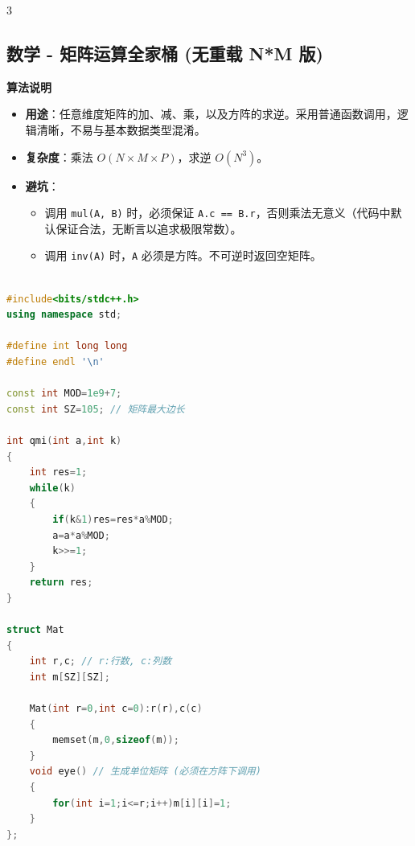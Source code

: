 \documentclass[10pt,landscape,a4paper]{article}
\begin{document}
\begin{multicols*}{3}
\subsection*{数学 - 矩阵运算全家桶 (无重载 N*M 版)}
\par\addvspace{0.7ex}\noindent\textbf{算法说明}\par\nobreak
\begin{itemize}
\item \textbf{用途}：任意维度矩阵的加、减、乘，以及方阵的求逆。采用普通函数调用，逻辑清晰，不易与基本数据类型混淆。
\item \textbf{复杂度}：乘法 $O(N \times M \times P)$，求逆 $O(N^3)$。
\item \textbf{避坑}：
\begin{itemize}
\item 调用 \texttt{m\allowbreak{}u\allowbreak{}l\allowbreak{}(\allowbreak{}A\allowbreak{},\allowbreak{} \allowbreak{}B\allowbreak{})} 时，必须保证 \texttt{A\allowbreak{}.\allowbreak{}c\allowbreak{} \allowbreak{}=\allowbreak{}=\allowbreak{} \allowbreak{}B\allowbreak{}.\allowbreak{}r}，否则乘法无意义（代码中默认保证合法，无断言以追求极限常数）。
\item 调用 \texttt{i\allowbreak{}n\allowbreak{}v\allowbreak{}(\allowbreak{}A\allowbreak{})} 时，\texttt{A} 必须是方阵。不可逆时返回空矩阵。
\end{itemize}
\end{itemize}
\par{}\par
\begin{lstlisting}[language=C++]

#include<bits/stdc++.h>
using namespace std;

#define int long long
#define endl '\n'

const int MOD=1e9+7;
const int SZ=105; // 矩阵最大边长

int qmi(int a,int k)
{
    int res=1;
    while(k)
    {
        if(k&1)res=res*a%MOD;
        a=a*a%MOD;
        k>>=1;
    }
    return res;
}

struct Mat
{
    int r,c; // r:行数, c:列数
    int m[SZ][SZ];
    
    Mat(int r=0,int c=0):r(r),c(c)
    {
        memset(m,0,sizeof(m));
    }
    void eye() // 生成单位矩阵 (必须在方阵下调用)
    {
        for(int i=1;i<=r;i++)m[i][i]=1;
    }
};


\end{lstlisting}
\end{multicols*}
\end{document}
